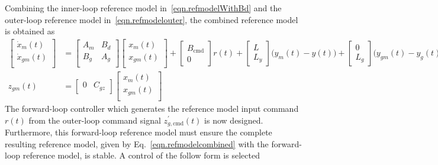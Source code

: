 Combining the inner-loop reference model in\ \eqref{eqn.refmodelWithBd} and the outer-loop reference model in\ \eqref{eqn.refmodelouter}, the combined reference model is obtained as
\begin{equation}
  \label{eqn.refmodelcombined}
  \begin{split}
    \begin{bmatrix}
      \dot{x}_{m}(t) \\
      \dot{x}_{gm}(t) \\
    \end{bmatrix}
    &=
    \begin{bmatrix}
      A_{m} & B_{d} \\
      B_{g} & A_{g} \\
    \end{bmatrix}
    \begin{bmatrix}
      x_{m}(t) \\
      x_{gm}(t) \\
    \end{bmatrix}
    +
    \begin{bmatrix}
      B_{\text{cmd}} \\
      0
    \end{bmatrix} r(t)
    +
    \begin{bmatrix}
      L \\
      L_{y}
    \end{bmatrix}\bigr(y_{m}(t)-y(t)\bigr)
    +
    \begin{bmatrix}
      0 \\
      L_{g}
    \end{bmatrix}\bigr(y_{gm}(t)-y_{g}(t)\bigr) \\
    z_{gm}(t) &=
    \begin{bmatrix}
      0 & C_{gz}
    \end{bmatrix}
    \begin{bmatrix}
      x_{m}(t) \\
      x_{gm}(t) \\
    \end{bmatrix}
  \end{split}
\end{equation}
The forward-loop controller which generates the reference model input command $r(t)$ from the outer-loop command signal $z_{g,\text{cmd}}^{\prime}(t)$ is now designed.
Furthermore, this forward-loop reference model must ensure the complete resulting reference model, given by Eq.\ \eqref{eqn.refmodelcombined} with the forward-loop reference model, is stable.
A control of the follow form is selected

